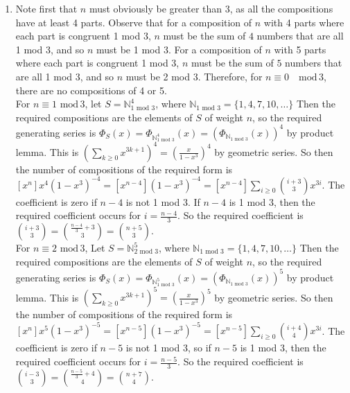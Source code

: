 \documentclass[10pt,english]{article}
\begin{document}
\begin{enumerate}
\pagebreak
\item Note first that $n$ must obviously be greater than 3, as all the compositions have at least 4 parts. Observe that for a composition of $n$ with 4 parts where each part is congruent 1 mod 3, $n$ must be the sum of $4$ numbers that are all 1 mod 3, and so $n$ must be 1 mod 3. For a composition of $n$ with 5 parts where each part is congruent 1 mod 3, $n$ must be the sum of $5$ numbers that are all 1 mod 3, and so $n$ must be 2 mod 3. Therefore, for $n\equiv0\quad\text{mod}\,3$, there are no compositions of 4 or 5. \\ 
For $n\equiv1\,\,\text{mod}\,3$, let $S=\mathbb{N}^4_{\text{1 mod 3}}$, where $\mathbb{N}_{\text{1 mod 3}}=\{1,4,7,10,\ldots\}$ Then the required compositions are the elements of $S$ of weight $n$, so the required generating series is $\Phi_S(x)=\Phi_{\mathbb{N}^4_{\text{1 mod 3}}}(x)=\left(\Phi_{\mathbb{N}_{\text{1 mod 3}}}(x)\right)^4$ by product lemma. This is $\left(\sum_{k\geq0}x^{3k+1}\right)^4=\left(\frac{x}{1-x^3}\right)^4$ by geometric series. So then the number of compositions of the required form is $[x^n]x^4(1-x^3)^{-4}=[x^{n-4}](1-x^3)^{-4}=[x^{n-4}]\sum_{i\geq0}{i+3\choose3}x^{3i}$. The coefficient is zero if $n-4$ is not 1 mod 3. If $n-4$ is 1 mod 3, then the required coefficient occurs for $i=\frac{n-4}{3}$. So the required coefficient is ${i+3\choose3}={\frac{n-4}{3}+3\choose 3}={n+5\choose 3}$. \\ 
For $n\equiv2\,\,\text{mod}\,3$, Let $S=\mathbb{N}^5_{\text{2 mod 3}}$, where $\mathbb{N}_{\text{1 mod 3}}=\{1,4,7,10,\ldots\}$ Then the required compositions are the elements of $S$ of weight $n$, so the required generating series is $\Phi_S(x)=\Phi_{\mathbb{N}^5_{\text{1 mod 3}}}(x)=\left(\Phi_{\mathbb{N}_{\text{1 mod 3}}}(x)\right)^5$ by product lemma. This is $\left(\sum_{k\geq0}x^{3k+1}\right)^5=\left(\frac{x}{1-x^3}\right)^5$ by geometric series. So then the number of compositions of the required form is $[x^n]x^5(1-x^3)^{-5}=[x^{n-5}](1-x^3)^{-5}=[x^{n-5}]\sum_{i\geq0}{i+4\choose4}x^{3i}$. The coefficient is zero if $n-5$ is not 1 mod 3, so if $n-5$ is 1 mod 3, then the required coefficient occurs for $i=\frac{n-5}{3}$. So the required coefficient is ${i-3\choose3}={\frac{n-5}{3}+4\choose 4}={n+7\choose 4}$.


\end{enumerate}
\end{document}
